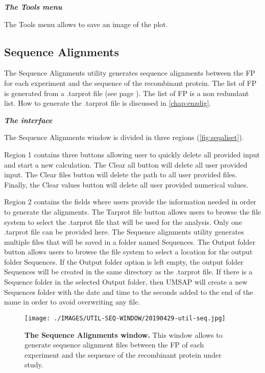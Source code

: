 \textit{\textbf{The Tools menu}}

The Tools menu allows to save an image of the plot.

\subsection{Sequence Alignments}
\label{subsec:seqali}
The Sequence Alignments utility generates sequence alignments between the FP for each experiment and the sequence of the recombinant protein. The list of FP is generated from a .tarprot file (see page \pageref{par:PIP}). The list of FP is a non redundant list. How to generate the .tarprot file is discussed in \autoref{chap:enzdig}.

\textit{\textbf{The interface}}

The Sequence Alignments window is divided in three regions (\autoref{fig:seqaliset}).

Region \num{1} contains three buttons allowing user to quickly delete all provided input and start a new calculation. The Clear all button will delete all user provided input. The Clear files button will delete the path to all user provided files. Finally, the Clear values button will delete all user provided numerical values.

Region \num{2} contains the fields where users provide the information needed in order to generate the alignments. The Tarprot file button allows users to browse the file system to select the .tarprot file that will be used for the analysis. Only one .tarprot file can be provided here. The Sequence alignments utility generates multiple files that will be saved in a folder named Sequences. The Output folder button allows users to browse the file system to select a location for the output folder Sequences. If the Output folder option is left empty, the output folder Sequences will be created in the same directory as the .tarprot file. If there is a Sequence folder in the selected Output folder, then UMSAP will create a new Sequences folder with the date and time to the seconds added to the end of the name in order to avoid overwriting any file. 

\begin{figure}[h]
	\centering
	\texttt{[image: ./IMAGES/UTIL-SEQ-WINDOW/20190429-util-seq.jpg]}	    
	\caption[The Sequence Alignments window]{\textbf{The Sequence Alignments window.} This window allows to generate sequence alignment files between the FP of each experiment and the sequence of the recombinant protein under study.} 
	\label{fig:seqaliset}
	\vspace{-5pt} 	
\end{figure} 


